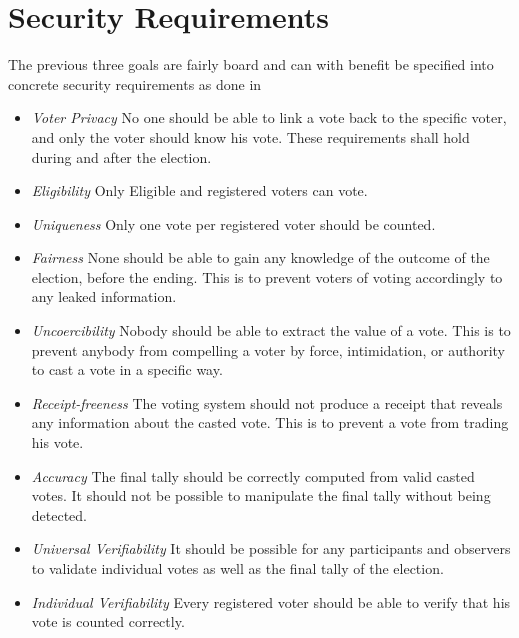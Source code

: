 \section{Security Requirements}
The previous three goals are fairly board and can with benefit be specified into concrete security requirements as done in \cite{Cet08}

\begin{itemize}
    \item \textit{Voter Privacy}
        No one should be able to link a vote back to the specific voter, and only the voter should
        know his vote. These requirements shall hold during and after the election.  
    
    \item \textit{Eligibility}    
        Only Eligible and registered voters can vote. 
    
    \item \textit{Uniqueness}
        Only one vote per registered voter should be counted.
    
    \item \textit{Fairness}
        None should be able to gain any knowledge of the outcome of the election, before the ending. This is to prevent voters of voting accordingly to any leaked information. 
    
    \item \textit{Uncoercibility}
        Nobody should be able to extract the value of a vote. This is to prevent anybody from compelling a voter by force, intimidation, or authority to cast a vote in a specific way. 
    
    \item \textit{Receipt-freeness} 
        The voting system should not produce a receipt that reveals any information about the casted vote. This is to prevent a vote from trading his vote. 
    
    \item \textit{Accuracy} 
        The final tally should be correctly computed from valid casted votes. It should not be
        possible to manipulate the final tally without being detected. 
    
    \item \textit{Universal Verifiability}
        It should be possible for any participants and observers to validate individual votes as well as the final tally of the election. 
    
    \item \textit{Individual Verifiability}    
        Every registered voter should be able to verify that his vote is counted correctly. 
    
\end{itemize}


